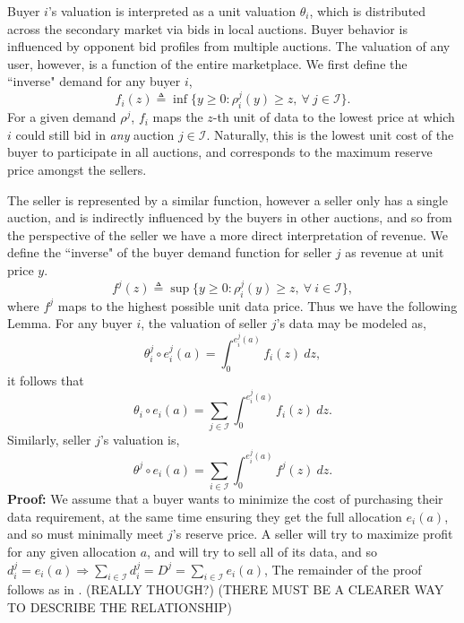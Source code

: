 \documentclass[12pt]{article}
\theoremstyle{definition}
\newcommand{\mcI}{\mathcal{I}}
\begin{document}
\begin{multicols}{2}
Buyer $i$'s valuation is interpreted as a unit valuation $\theta_i$,
which is distributed across the secondary market via bids in local auctions. 
Buyer behavior is influenced by opponent bid profiles from multiple auctions.
The valuation of any user, however, is a function of the entire marketplace.  
We first define the ``inverse" demand for any buyer $i$,
\begin{equation}\label{buyerinversedemand}
    f_i(z) \triangleq \inf\big\lbrace y\ge 0:
        \rho_i^j(y) \ge z, \ \forall \ j \in \mcI\big\rbrace.
\end{equation}
For a given demand $\rho^j$, $f_i$ maps the $z$-th unit of data to the lowest price at
which $i$ could still bid in \emph{any} auction $j\in\mcI$.
Naturally, this is the
lowest unit cost of the buyer to participate in all auctions, and corresponds to
the maximum reserve price amongst the sellers. 

The seller is represented by a similar function, however a seller only has a
single auction, and is indirectly influenced by the buyers in other auctions, and so from the perspective of the
seller we have a more direct interpretation of revenue.
We define the ``inverse" of the buyer demand function for seller $j$ as revenue at unit price $y$. 
\begin{equation}\label{sellerinversedemand}
    f^j(z) \triangleq \sup\big\lbrace y\ge 0:
        \rho_i^j(y) \ge z, \ \forall \ i \in \mcI\big\rbrace,
\end{equation}
where $f^j$ maps to the highest possible unit data price.
Thus we have the following Lemma. 
{
\label{uservaluation}
For any buyer $i$, the valuation of seller $j$'s data may be modeled as,
\begin{equation}\label{singlevaluation}
    \theta_i^j \circ e_i^j(a) = \int_0^{e_i^j(a)} f_i(z) \ dz,
\end{equation}
it follows that 
\begin{equation}\label{buyervaluation}
    \theta_i \circ e_i(a) = \displaystyle\sum_{j\in\mcI}
 \int_0^{e_i^j(a)} f_i(z) \ dz.
\end{equation}
Similarly, seller $j$'s valuation is,
\begin{equation}\label{sellervaluation}
    \theta^j \circ e_i(a) = \displaystyle\sum_{i\in\mcI}
 \int_0^{e_i^j(a)} f^j(z) \ dz.
\end{equation}
}
\textbf{Proof:} 
We assume that a buyer wants to minimize the cost of purchasing their data
requirement, at the same time ensuring they get the full allocation $e_i(a)$,
and so must minimally meet $j$'s reserve price.
A seller will try to maximize profit for any given allocation $a$,
and will try to sell all of its data, and so 
$d_i^j = e_i(a) \Rightarrow \sum_{i\in{\mcI}} d_i^j = D^j =
\sum_{i\in\mcI} e_i(a)$,
The remainder of the proof follows as in \cite{semret}. (REALLY THOUGH?)
(THERE MUST BE A CLEARER WAY TO DESCRIBE THE RELATIONSHIP)


\end{multicols}
\end{document}
